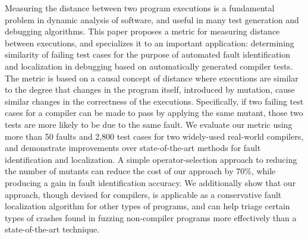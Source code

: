 Measuring the distance between two program executions is a fundamental problem in dynamic analysis of software, and useful in many test generation and debugging algorithms.  This paper proposes a metric for measuring distance between executions, and specializes it to an important application: determining similarity of failing test cases for the purpose of automated fault identification and localization in debugging based on automatically generated compiler tests.  The metric is based on a causal concept of distance where executions are similar to the degree that changes in the program itself, introduced by mutation, cause similar changes in the correctness of the executions.  Specifically, if two failing test cases for a compiler can be made to pass by applying the same mutant, those two tests are more likely to be due to the same fault.  We evaluate our metric using more than 50 faults and 2,800 test cases for two widely-used real-world compilers, and demonstrate improvements over state-of-the-art methods for fault identification and localization.  A simple operator-selection approach to reducing the number of mutants can reduce the cost of our approach by 70\%, while producing a gain in fault identification accuracy.  We additionally show that our approach, though devised for compilers, is applicable as a conservative fault localization algorithm for other types of programs, and can help triage certain types of crashes found in fuzzing non-compiler programs more effectively than a state-of-the-art technique.